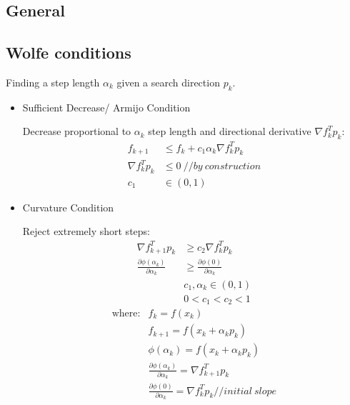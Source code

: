 \documentclass[8pt,letter]{article}
\begin{document}

\begin{multicols*}{2}

  \section{General}

  \subsection{Wolfe conditions}

  Finding a step length $\alpha_k$ given a search direction $p_k$.
  
  \begin{itemize}
    
  \item Sufficient Decrease/ Armijo Condition
    
    Decrease proportional to $\alpha_k$ step length and directional derivative $\nabla f_k^T p_k$:
    \begin{align}
      f_{k+1} & \leq f_k + c_1 \alpha_k \nabla f_k^T p_k\\
      \nabla f_k^T p_k & \leq 0\ //by\ construction\\
      c_1 & \in (0,1)
    \end{align}
    
  \item Curvature Condition
    
    Reject extremely short steps:
    \begin{align}
      \nabla f_{k+1}^T p_k & \geq c_2 \nabla f_k^T p_k\\
      \frac{\partial \phi(\alpha_k)}{\partial \alpha_k} & \geq \frac{\partial \phi(0)}{\partial \alpha_k}\\
      &c_1,\alpha_k \in (0,1)\\
      &0<c_1<c_2<1
    \end{align}
    \begin{align*}
      \text{where}:& f_{k} = f(x_k)\\
      & f_{k+1} = f(x_k+\alpha_k p_k)\\
      & \phi(\alpha_k) = f(x_k + \alpha_k p_k)\\
      & \frac{\partial \phi(\alpha_k)}{\partial \alpha_k} = \nabla f_{k+1}^T p_k\\
      & \frac{\partial \phi(0)}{\partial \alpha_k} = \nabla f_{k}^T p_k //initial\ slope
    \end{align*}


\end{itemize}
\end{multicols*}
\end{document}
